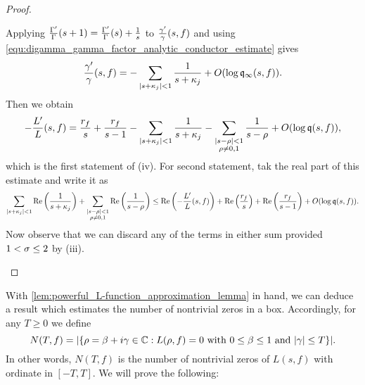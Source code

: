 \begin{proof}
\begin{enumerate}[label*=(\roman*)]
\[        \]
        Applying $\frac{\Gamma'}{\Gamma}(s+1) = \frac{\Gamma'}{\Gamma}(s)+\frac{1}{s}$ to $\frac{\gamma'}{\gamma}(s,f)$ and using \cref{equ:digamma_gamma_factor_analytic_conductor_estimate} gives
        \[
          \frac{\gamma'}{\gamma}(s,f) = -\sum_{|s+\kappa_{j}| < 1}\frac{1}{s+\kappa_{j}}+O(\log{\mathfrak{q}_{\infty}(s,f)}).
        \]
        Then we obtain
        \[
          -\frac{L'}{L}(s,f) = \frac{r_{f}}{s}+\frac{r_{f}}{s-1}-\sum_{|s+\kappa_{j}| < 1}\frac{1}{s+\kappa_{j}}-\sum_{\substack{|s-\rho| < 1 \\ \rho \neq 0,1}}\frac{1}{s-\rho}+O(\log{\mathfrak{q}(s,f)}),
        \]
        which is the first statement of (iv). For second statement, tak the real part of this estimate and write it as
        \[
          \sum_{|s+\kappa_{j}| < 1}\mathrm{Re}\left(\frac{1}{s+\kappa_{j}}\right)+\sum_{\substack{|s-\rho| < 1 \\ \rho \neq 0,1}}\mathrm{Re}\left(\frac{1}{s-\rho}\right) \le \mathrm{Re}\left(-\frac{L'}{L}(s,f)\right)+\mathrm{Re}\left(\frac{r_{f}}{s}\right)+\mathrm{Re}\left(\frac{r_{f}}{s-1}\right)+O(\log{\mathfrak{q}(s,f)}).
        \]
        Now observe that we can discard any of the terms in either sum provided $1 < \sigma \le 2$ by (iii).
      \end{enumerate}
    \end{proof}

    With \cref{lem:powerful_L-function_approximation_lemma} in hand, we can deduce a result which estimates the number of nontrivial zeros in a box. Accordingly, for any $T \ge 0$ we define
    \[
      N(T,f) = |\{\rho = \beta+i\gamma \in \mathbb{C}:\text{$L(\rho,f) = 0$ with $0 \le \beta \le 1$ and $|\gamma| \le T$}\}|.
    \]
    In other words, $N(T,f)$ is the number of nontrivial zeros of $L(s,f)$ with ordinate in $[-T,T]$. We will prove the following:

